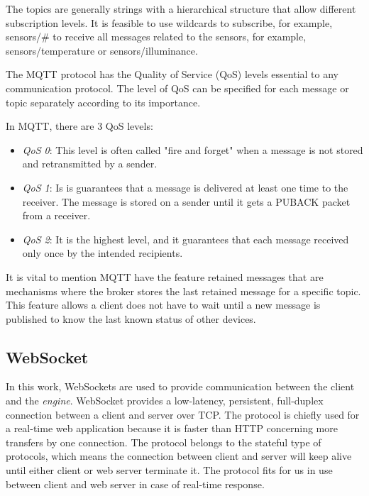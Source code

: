 The topics are generally strings with a hierarchical structure that allow different subscription levels. It is feasible to use wildcards to subscribe, for example, sensors/\# to receive all messages related to the sensors, for example, sensors/temperature or sensors/illuminance.

The MQTT protocol has the Quality of Service (QoS) levels essential to any communication protocol.  The level of QoS can be specified for each message or topic separately according to its importance.

In MQTT, there are 3 QoS levels:

\begin{itemize}
	\item \textit{QoS 0}: This level is often called "fire and forget" when a message is not stored and retransmitted by a sender.
	\item \textit{QoS 1}: Is is guarantees that a message is delivered at least one time to the receiver. The message is stored on a sender until it gets a PUBACK packet from a receiver.
	\item \textit{QoS 2}: It is the highest level, and it guarantees that each message received only once by the intended recipients.
\end{itemize}

It is vital to mention MQTT have the feature retained messages that are mechanisms where the broker stores the last retained message for a specific topic. This feature allows a client does not have to wait until a new message is published to know the last known status of other devices.
 
\subsection{WebSocket} \label{section:websocket}
 
In this work, WebSockets are used to provide communication between the client and the \textit{engine}. WebSocket provides a low-latency, persistent, full-duplex connection between a client and server over TCP. The protocol is chiefly used for a real-time web application because it is faster than HTTP concerning more transfers by one connection. The protocol belongs to the stateful type of protocols, which means the connection between client and server will keep alive until either client or web server terminate it. The protocol fits for us in use between client and web server in case of real-time response.\citep{websocket_wang_salim_moskovits_2013}

